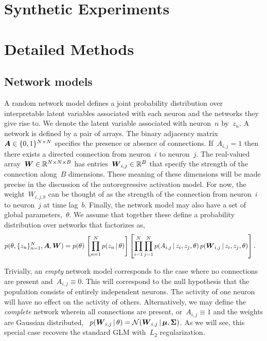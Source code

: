 \section{Synthetic Experiments}

\section{Detailed Methods}

\subsection{Network models}
A random network model defines a joint probability distribution over interpretable latent variables associated with each neuron and the networks they give rise to. 
We denote the latent variable associated with neuron~$n$ by~$z_n$.  
A network is defined by a pair of arrays. 
The binary adjacency matrix~$\boldsymbol{A} \in \{0,1\}^{N\times N}$ specifies the presence or absence of connections. 
If~$A_{i,j}=1$ then there exists a directed connection from neuron~$i$ to neuron~$j$.
The real-valued array~$\boldsymbol{W} \in \mathbb{R}^{N \times N \times B}$ has entries~$\boldsymbol{W}_{i,j} \in \mathbb{R}^B$ that specify the strength of the connection along~$B$ dimensions.
These meaning of these dimensions will be made precise in the discussion of the autoregressive activation model.
For now, the weight~$W_{i,j,b}$ can be thought of as the strength of the connection from neuron~$i$ to neuron~$j$ at time lag~$b$.
Finally, the network model may also have a set of global parameters,~$\theta$. 
We assume that together these define a probability distribution over networks that factorizes as,
\begin{align}
p(\theta, \{z_n\}_{n=1}^N, \boldsymbol{A}, \boldsymbol{W}) &= 
p(\theta) \, 
\left[ \prod_{n=1}^N p(z_n \,|\, \theta) \right]  
\left[ \prod_{i=1}^N \prod_{j=1}^N p(A_{i,j} \,|\, z_{i}, z_{j}, \theta) \, 
p(\boldsymbol{W}_{i,j} \,|\, z_{i}, z_{j}, \theta) \right].
\end{align}

Trivially, an \emph{empty} network model corresponds to the case where no connections are present and~${A_{i,j} \equiv 0}$. 
This will correspond to the null hypothesis that the population consists of entirely independent neurons. 
The activity of one neuron will have no effect on the activity of others. 
Alternatively, we may define the \emph{complete} network wherein all connections are present, or~${A_{i,j} \equiv 1}$ and the weights are Gaussian distributed,
~${p(\boldsymbol{W}_{i,j} \,|\, \theta) = \mathcal{N}(\boldsymbol{W}_{i,j} \,|\, \boldsymbol{\mu}, \boldsymbol{\Sigma})}$. 
As we will see, this special case recovers the standard GLM with~$L_2$ regularization. 


